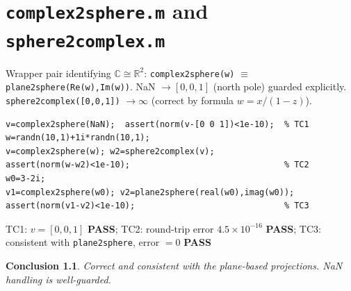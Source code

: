 \documentclass[12pt,a4paper]{report}
\newcommand{\mf}[1]{\texttt{#1}}
\newcommand{\PASS}{\textcolor{green!60!black}{\textbf{PASS}}}
\newtheorem{concl}{Conclusion}[chapter]
\begin{document}
\chapter{\mf{complex2sphere.m} and \mf{sphere2complex.m}}
\begin{tcolorbox}[Abox,title=Analysis]
Wrapper pair identifying $\mathbb{C}\cong\mathbb{R}^2$: \mf{complex2sphere(w)} $\equiv$ \mf{plane2sphere(Re(w),Im(w))}. NaN $\to [0,0,1]$ (north pole) guarded explicitly. \mf{sphere2complex([0,0,1])} $\to\infty$ (correct by formula $w=x/(1-z)$).
\end{tcolorbox}
\begin{lstlisting}[caption={Tests for complex2sphere.m / sphere2complex.m}]
v=complex2sphere(NaN);  assert(norm(v-[0 0 1])<1e-10);  % TC1
w=randn(10,1)+1i*randn(10,1);
v=complex2sphere(w); w2=sphere2complex(v);
assert(norm(w-w2)<1e-10);                               % TC2
w0=3-2i;
v1=complex2sphere(w0); v2=plane2sphere(real(w0),imag(w0));
assert(norm(v1-v2)<1e-10);                              % TC3
\end{lstlisting}
\begin{tcolorbox}[Pbox,title=TC1--TC3 -- All pass]
TC1: $v=[0,0,1]$ \PASS; TC2: round-trip error $4.5\times10^{-16}$ \PASS; TC3: consistent with \mf{plane2sphere}, error $=0$ \PASS
\end{tcolorbox}
\begin{concl}
Correct and consistent with the plane-based projections. NaN handling is well-guarded.
\end{concl}

\end{document}
